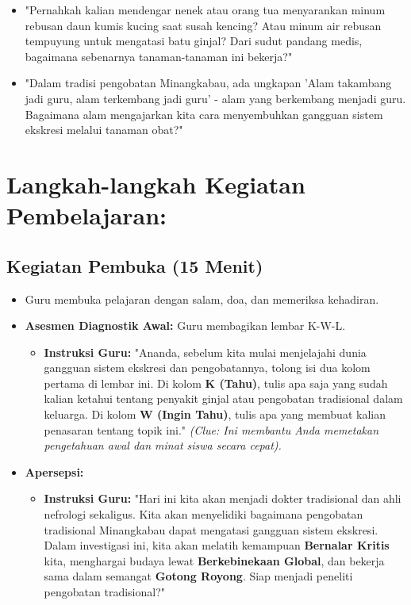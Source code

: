 \documentclass[a4paper,12pt]{article}
\begin{document}
\begin{itemize}
\item "Pernahkah kalian mendengar nenek atau orang tua menyarankan minum rebusan daun kumis kucing saat susah kencing? Atau minum air rebusan tempuyung untuk mengatasi batu ginjal? Dari sudut pandang medis, bagaimana sebenarnya tanaman-tanaman ini bekerja?"
\item "Dalam tradisi pengobatan Minangkabau, ada ungkapan 'Alam takambang jadi guru, alam terkembang jadi guru' - alam yang berkembang menjadi guru. Bagaimana alam mengajarkan kita cara menyembuhkan gangguan sistem ekskresi melalui tanaman obat?"
\end{itemize}

\section{Langkah-langkah Kegiatan Pembelajaran:}

\subsection{Kegiatan Pembuka (15 Menit)}
\begin{itemize}
\item Guru membuka pelajaran dengan salam, doa, dan memeriksa kehadiran.
\item \textbf{Asesmen Diagnostik Awal:} Guru membagikan lembar K-W-L.
    \begin{itemize}
    \item \textbf{Instruksi Guru:} "Ananda, sebelum kita mulai menjelajahi dunia gangguan sistem ekskresi dan pengobatannya, tolong isi dua kolom pertama di lembar ini. Di kolom \textbf{K (Tahu)}, tulis apa saja yang sudah kalian ketahui tentang penyakit ginjal atau pengobatan tradisional dalam keluarga. Di kolom \textbf{W (Ingin Tahu)}, tulis apa yang membuat kalian penasaran tentang topik ini." \textit{(Clue: Ini membantu Anda memetakan pengetahuan awal dan minat siswa secara cepat).}
    \end{itemize}
\item \textbf{Apersepsi:}
    \begin{itemize}
    \item \textbf{Instruksi Guru:} "Hari ini kita akan menjadi dokter tradisional dan ahli nefrologi sekaligus. Kita akan menyelidiki bagaimana pengobatan tradisional Minangkabau dapat mengatasi gangguan sistem ekskresi. Dalam investigasi ini, kita akan melatih kemampuan \textbf{Bernalar Kritis} kita, menghargai budaya lewat \textbf{Berkebinekaan Global}, dan bekerja sama dalam semangat \textbf{Gotong Royong}. Siap menjadi peneliti pengobatan tradisional?"
    \end{itemize}
\end{itemize}
\end{document}
